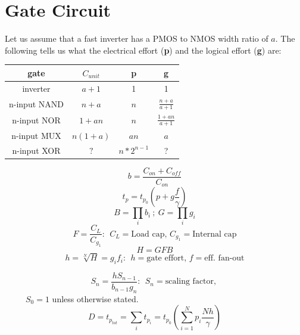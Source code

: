 \documentclass[twocolumn]{article}
\begin{document}
\section*{Gate Circuit}
Let us assume that a fast inverter has a PMOS to NMOS width ratio of $a$. The following tells us what the electrical effort (\textbf{p}) and the logical effort (\textbf{g}) are:
\begin{center}
\begin{tabular}{|c|c|c|c|}
    \hline
    gate& $C_{unit}$& p & g\\
    \hline
    inverter&$a+1$ & 1 & 1\\
    \hline
    n-input NAND&$n+a$&$n$&$\frac{n+a}{a+1}$\\
    \hline
    n-input NOR&$1+an$&$n$&$\frac{1+an}{a+1}$\\
    \hline
    n-input MUX&$n(1+a)$&$an$&$a$\\
    \hline
    n-input XOR&$?$&$n*2^{n-1}$&?\\
    \hline
\end{tabular}
\end{center}
\begin{equation*}
    b=\frac{C_{on}+C_{off}}{C_{on}}
\end{equation*}
\begin{equation*}
    t_p = t_{p_0}\left(p+g\frac{f}{\gamma}\right)
\end{equation*}
\begin{equation*}
    B = \prod_{i} b_i~;~G = \prod_{i} g_i
\end{equation*}
\begin{equation*}
    F = \frac{C_L}{C_{g_1}}:~~ C_L=\text{Load cap, } C_{g_1}=\text{Internal cap}
\end{equation*}
\begin{equation*}
    H = GFB
\end{equation*}
\begin{equation*}
    h = \sqrt[N]{H}= g_i f_i :~~ h=\text{gate effort, }f=\text{eff. fan-out} 
\end{equation*}

\begin{equation*}
    S_n = \frac{hS_{n-1}}{b_{n-1}g_n}:~~ S_n=\text{scaling factor, }
\end{equation*}
~~~~~$S_0=1$ unless otherwise stated.
\begin{equation*}
    D = t_{p_{tot}} = \sum_{i} t_{p_i} = t_{p_0}\left(\sum_{i=1}^{N}p_i \frac{Nh}{\gamma}\right)
\end{equation*}
\end{document}

